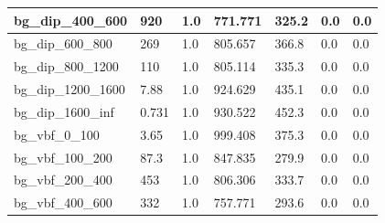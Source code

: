 \documentclass[a4paper, 10pt]{article}
\begin{document}
\begin{table}[H]
\begin{center}
\begin{tabular}{|m{23.0mm}|m{23.0mm}|m{18.0mm}|m{19.0mm}|m{19.0mm}|m{19.0mm}|m{19.0mm}|}
      \hline
      {\cellcolor{white}         bg\_dip\_400\_600}& {\cellcolor{white}         920}& {\cellcolor{white}         1.0}& {\cellcolor{white}         771.771}& {\cellcolor{white}         325.2}& {\cellcolor{green}         0.0}& {\cellcolor{green}         0.0}\\
      \hline
      {\cellcolor{white}         bg\_dip\_600\_800}& {\cellcolor{white}         269}& {\cellcolor{white}         1.0}& {\cellcolor{white}         805.657}& {\cellcolor{white}         366.8}& {\cellcolor{green}         0.0}& {\cellcolor{green}         0.0}\\
      \hline
      {\cellcolor{white}         bg\_dip\_800\_1200}& {\cellcolor{white}         110}& {\cellcolor{white}         1.0}& {\cellcolor{white}         805.114}& {\cellcolor{white}         335.3}& {\cellcolor{green}         0.0}& {\cellcolor{green}         0.0}\\
      \hline
      {\cellcolor{white}         bg\_dip\_1200\_1600}& {\cellcolor{white}         7.88}& {\cellcolor{white}         1.0}& {\cellcolor{white}         924.629}& {\cellcolor{white}         435.1}& {\cellcolor{green}         0.0}& {\cellcolor{green}         0.0}\\
      \hline
      {\cellcolor{white}         bg\_dip\_1600\_inf}& {\cellcolor{white}         0.731}& {\cellcolor{white}         1.0}& {\cellcolor{white}         930.522}& {\cellcolor{white}         452.3}& {\cellcolor{green}         0.0}& {\cellcolor{green}         0.0}\\
      \hline
      {\cellcolor{white}         bg\_vbf\_0\_100}& {\cellcolor{white}         3.65}& {\cellcolor{white}         1.0}& {\cellcolor{white}         999.408}& {\cellcolor{white}         375.3}& {\cellcolor{green}         0.0}& {\cellcolor{green}         0.0}\\
      \hline
      {\cellcolor{white}         bg\_vbf\_100\_200}& {\cellcolor{white}         87.3}& {\cellcolor{white}         1.0}& {\cellcolor{white}         847.835}& {\cellcolor{white}         279.9}& {\cellcolor{green}         0.0}& {\cellcolor{green}         0.0}\\
      \hline
      {\cellcolor{white}         bg\_vbf\_200\_400}& {\cellcolor{white}         453}& {\cellcolor{white}         1.0}& {\cellcolor{white}         806.306}& {\cellcolor{white}         333.7}& {\cellcolor{green}         0.0}& {\cellcolor{green}         0.0}\\
      \hline
      {\cellcolor{white}         bg\_vbf\_400\_600}& {\cellcolor{white}         332}& {\cellcolor{white}         1.0}& {\cellcolor{white}         757.771}& {\cellcolor{white}         293.6}& {\cellcolor{green}         0.0}& {\cellcolor{green}         0.0}\\

\end{tabular}
\end{center}
\end{table}
\end{document}
